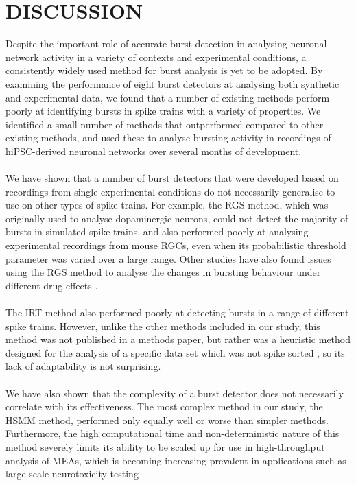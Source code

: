\documentclass[12pt, titlepage]{article}
\begin{document}
	\section*{DISCUSSION}
	Despite the important role of accurate burst detection in analysing neuronal network activity in a variety of contexts and experimental conditions, a consistently widely used method for burst analysis is yet to be adopted. By examining the performance of eight burst detectors at analysing both synthetic and experimental data, we found that a number of existing methods perform poorly at identifying bursts in spike trains with a variety of properties. We identified a small number of methods that outperformed compared to other existing methods, and used these to analyse bursting activity in recordings of hiPSC-derived neuronal networks over several months of development.
	\\ \\We have shown that a number of burst detectors that were developed based on recordings from single experimental conditions do not necessarily generalise to use on other types of spike trains. For example, the RGS method, which was originally used to analyse dopaminergic neurons, could not detect the majority of bursts in simulated spike trains, and also performed poorly at analysing experimental recordings from mouse RGCs, even when its probabilistic threshold parameter was varied over a large range. Other studies have also found issues using the RGS method to analyse the changes in bursting behaviour under different drug effects \cite{Eisenman2015}. 
	\\ \\The IRT method also performed poorly at detecting bursts in a range of different spike trains. However, unlike the other methods included in our study, this method was not published in a methods paper, but rather was a heuristic method designed for the analysis of a specific data set which was not spike sorted \cite{Hennig2011}, so its lack of adaptability is not surprising.
	\\ \\We have also shown that the complexity of a burst detector does not necessarily correlate with its effectiveness. The most complex method in our study, the HSMM method, performed only equally well or worse than simpler methods. Furthermore, the high computational time and non-deterministic nature of this method severely limits its ability to be scaled up for use in high-throughput analysis of MEAs, which is becoming increasing prevalent in applications such as large-scale neurotoxicity testing \cite{Nicolas2014}.
\end{document}
